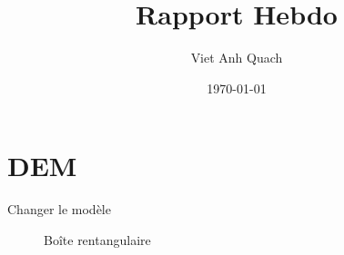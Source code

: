 \documentclass[10pt]{beamer}
\title{Rapport Hebdo}
\author{Viet Anh Quach}
\institute{3SR}
\date{\today}
\begin{document}
\begin{frame}
    \titlepage
\end{frame}


\section{DEM}
\begin{frame}{Changer le modèle}
    \begin{figure}[h]
        \centering
        \caption{Boîte rentangulaire}
    \end{figure}
\end{frame}
\end{document}
